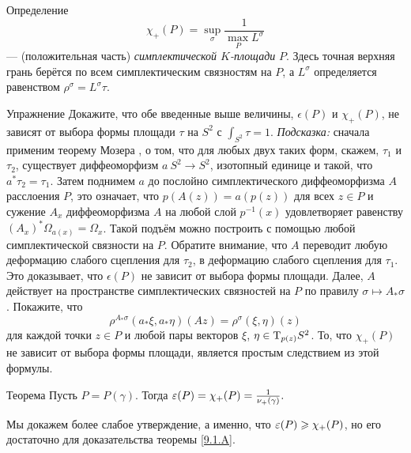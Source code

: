 \begin{ex*}{Определение}
\[\chi_+ (P) = \sup_\sigma \frac1{\max_P L^\sigma}\]  — (положительная часть) \emph{симплектической $K$-площади} $P$.
Здесь точная верхняя грань берётся по всем симплектическим связностям на $P$, а $L^\sigma$ определяется равенством $\rho^\sigma = L^\sigma \tau$.
\end{ex*}

\begin{ex*}{Упражнение}
Докажите, что обе введенные выше величины, $\epsilon(P)$ и $\chi_+
(P)$, не зависят от выбора формы площади $\tau$ на $S^2$ с $\int_{S^2}
\tau = 1$. 
\emph{Подсказка:} сначала применим теорему Мозера \cite{MS}, о том, что для
любых двух таких форм, скажем, $\tau_1$ и $\tau_2$, существует
диффеоморфизм $a\:S^2\to S^2$, изотопный единице и такой, что $a^\ast
\tau_2 = \tau_1$.
Затем поднимем $a$ до послойно симплектического диффеоморфизма $A$ расслоения $P$, это означает, что $p(A(z)) = a(p(z))$ для всех $z \in P$ и сужение $A_x$ диффеоморфизма $A$ на любой слой $p^{-1} (x)$ удовлетворяет равенству $(A_x)^\ast \Omega_{a(x)} = \Omega_x$.
Такой подъём можно построить с помощью любой симплектической связности
на $P$. 
Обратите внимание, что $A$ переводит любую деформацию слабого
сцепления для $\tau_2$, в деформацию слабого сцепления для
$\tau_1$.
Это доказывает, что $\epsilon(P)$ не зависит от выбора формы площади.
Далее, $A$ действует на пространстве симплектических связностей на $P$
по правилу $\sigma \mapsto A_\ast \sigma$.
Покажите, что 
\[\rho^{A_\ast \sigma} (a_\ast \xi, a_\ast \eta)(Az) = \rho^\sigma (\xi, \eta)(z)\]
для каждой точки $z \in P$ и любой пары векторов $\xi$, $\eta \in
\mathrm{T}_{p(z)} S^2$.
То, что $\chi_+(P)$ не зависит от выбора формы площади, является
простым следствием из этой формулы.
\end{ex*}

\begin{thm}[(\cite{P4})]{Теорема}\label{9.3.B}
  Пусть $P = P(\gamma)$.
  Тогда $\epsilon(P) = \chi_+ (P) \z= \frac1{\nu_+(\gamma)}.$
\end{thm}

Мы докажем более слабое утверждение, а именно, что $\epsilon(P) \z\ge
\chi_+ (P)$, но его достаточно для доказательства теоремы
\ref{9.1.A}.

